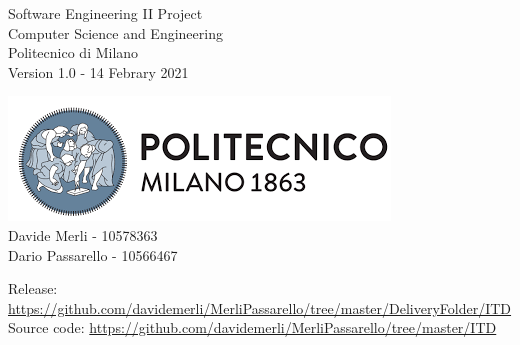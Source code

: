 \begin{titlepage}
\begin{center}
    \begin{multicols}{2}
      \large
      \begin{flushleft}
        Software Engineering II Project \\
        Computer Science and Engineering\\
        Politecnico di Milano\\
        Version 1.0 - 14 Febrary 2021 \\
      \end{flushleft}
      \begin{flushright}
        \includegraphics[scale=0.6]{Images/PolimiLogo.png} \\
        Davide Merli - 10578363\\
        Dario Passarello - 10566467 \\
      \end{flushright}
    \end{multicols}

    \small Release: \href{https://github.com/davidemerli/MerliPassarello/tree/master/DeliveryFolder/ITD}{https://github.com/davidemerli/MerliPassarello/tree/master/DeliveryFolder/ITD}
    \small Source code: \href{https://github.com/davidemerli/MerliPassarello/tree/master/ITD}{https://github.com/davidemerli/MerliPassarello/tree/master/ITD}
  \end{center}

\end{titlepage}

